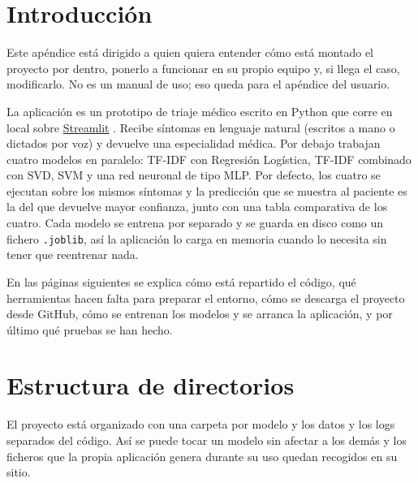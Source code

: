 
\section{Introducción}

Este apéndice está dirigido a quien quiera entender cómo está montado el proyecto por dentro, ponerlo a funcionar en su propio equipo y, si llega el caso, modificarlo. No es un manual de uso; eso queda para el apéndice del usuario.

La aplicación es un prototipo de triaje médico escrito en Python que corre en local sobre \href{https://streamlit.io/}{Streamlit} \cite{streamlit_official}. Recibe síntomas en lenguaje natural (escritos a mano o dictados por voz) y devuelve una especialidad médica. Por debajo trabajan cuatro modelos en paralelo: TF-IDF con Regresión Logística, TF-IDF combinado con SVD, SVM y una red neuronal de tipo MLP. Por defecto, los cuatro se ejecutan sobre los mismos síntomas y la predicción que se muestra al paciente es la del que devuelve mayor confianza, junto con una tabla comparativa de los cuatro. Cada modelo se entrena por separado y se guarda en disco como un fichero \texttt{.joblib}, así la aplicación lo carga en memoria cuando lo necesita sin tener que reentrenar nada.

En las páginas siguientes se explica cómo está repartido el código, qué herramientas hacen falta para preparar el entorno, cómo se descarga el proyecto desde GitHub, cómo se entrenan los modelos y se arranca la aplicación, y por último qué pruebas se han hecho.

\section{Estructura de directorios}

El proyecto está organizado con una carpeta por modelo y los datos y los logs separados del código. Así se puede tocar un modelo sin afectar a los demás y los ficheros que la propia aplicación genera durante su uso quedan recogidos en su sitio.

